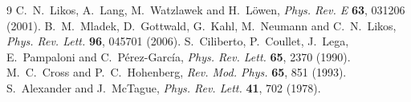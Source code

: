 \documentclass[11pt]{article}
\begin{document}
\begin{thebibliography}{9}
 C.~N.~Likos, A.~Lang, M.~Watzlawek and H.~L\"owen,
  \emph{Phys. Rev. E} \textbf{63}, 031206 (2001).
 B.~M.~Mladek, D.~Gottwald, G.~Kahl, M.~Neumann and
  C.~N.~Likos, \emph{Phys. Rev. Lett.} \textbf{96}, 045701 (2006).
 S.~Ciliberto, P.~Coullet, J.~Lega, E.~Pampaloni and
  C.~P\'erez-Garc\'ia, \emph{Phys. Rev. Lett.} \textbf{65}, 2370 (1990).
 M.~C.~Cross and P.~C.~Hohenberg, \emph{Rev. Mod. Phys.}
  \textbf{65}, 851 (1993).
 S.~Alexander and J.~McTague, \emph{Phys. Rev. Lett.}
  \textbf{41}, 702 (1978).
\end{thebibliography}
\end{document}
